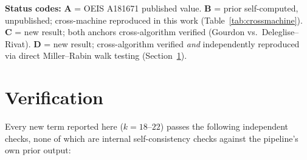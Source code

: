 \documentclass[11pt]{amsart}
\begin{document}
\medskip
\noindent\footnotesize
\textbf{Status codes:}
\textbf{A} = OEIS A181671 published value.
\textbf{B} = prior self-computed, unpublished; cross-machine reproduced in this work (Table~\ref{tab:crossmachine}).
\textbf{C} = new result; both anchors cross-algorithm verified (Gourdon vs.\ Deleglise--Rivat).
\textbf{D} = new result; cross-algorithm verified \emph{and} independently reproduced via direct Miller--Rabin walk testing (Section~\ref{sec:verification}).
\normalsize

\section{Verification}
\label{sec:verification}

Every new term reported here (\(k=18\)--\(22\)) passes
the following independent checks, none of which are internal
self-consistency checks against the pipeline's own prior output:
\end{document}
